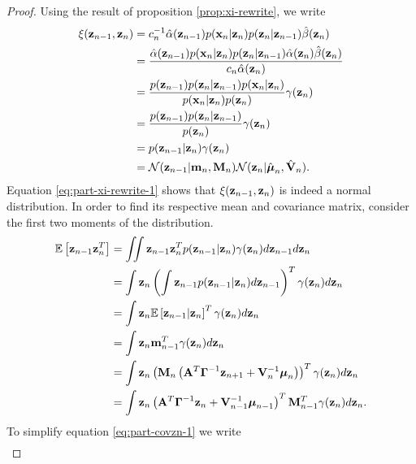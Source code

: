 \documentclass[11pt]{article}
\numberwithin{equation}{section}
\newcommand{\expectation}[1]{\mathbb{E}\left[#1\right]}
\newcommand{\x}{{\bf x}}
\newcommand{\z}{{\bf z}}
\newcommand{\N}{\mathcal{N}}
\begin{document}
\begin{proof}
	Using the result of proposition \ref{prop:xi-rewrite}, we write
	\begin{align}
		\xi(\z_{n-1}, \z_n) 
		&= c_n^{-1} \hat\alpha(\z_{n-1}) p(\x_n \vert \z_n) p(\z_n \vert \z_{n-1}) \hat\beta(\z_n) \\
		&= \frac{\hat\alpha(\z_{n-1}) p(\x_n \vert \z_n) p(\z_n \vert \z_{n-1}) \hat\alpha(\z_n)\hat\beta(\z_n)}{c_n \hat\alpha(\z_n)}\\
		&= \frac{p(\z_{n-1}) p(\z_n \vert \z_{n-1}) p(\x_n \vert \z_n)}{p(\x_n \vert \z_n) p(\z_n)} \label{eq:part-xi-rewrite-1}  \gamma(\z_n)\\
		&= \frac{p(\z_{n-1}) p(\z_n \vert \z_{n-1})}{p(\z_n)}  \gamma(\z_n)\\
		&= p(\z_{n-1} \vert \z_n) \gamma(\z_n) \\
		&= \N(\z_{n-1} \vert {\bf m}_n, {\bf M}_n) \N(\z_n \vert \hat{\boldsymbol\mu}_n, \hat{\bf V}_n) \label{eq:part-xi-rewrite}.
	\end{align}
	Equation \eqref{eq:part-xi-rewrite-1} shows that $\xi(\z_{n-1}, \z_n)$ is indeed a normal distribution. In order to find its respective mean and covariance matrix, consider the first two moments of the distribution.
	\begin{align}
		\expectation{\z_{n-1}\z_n^T} 
		&= \iint \z_{n-1}\z_{n}^T p(\z_{n-1} \vert \z_n) \gamma(\z_n) d\z_{n-1}d\z_n\\
		&= \int \z_n \left(\int \z_{n-1} p(\z_{n-1} \vert \z_n)  d\z_{n-1} \right)^T \gamma(\z_{n}) d\z_n\\
		&= \int \z_n \expectation{\z_{n-1} \vert \z_n}^T \gamma(\z_n) d\z_n\\
		&= \int \z_n {\bf m}_{n-1}^T \gamma(\z_n) d\z_n \\
		&= \int \z_n \left({\bf M}_n \left({\bf A}^T\boldsymbol\Gamma^{-1}\z_{n+1} + {\bf V}_n^{-1}\boldsymbol\mu_n\right)\right)^T \gamma(\z_n) d\z_n\\
		&= \int \z_n \left({\bf A}^T\boldsymbol\Gamma^{-1}\z_{n} + {\bf V}_{n-1}^{-1}\boldsymbol\mu_{n-1}\right)^T {\bf M}_{n-1}^T \gamma(\z_n) d\z_n \label{eq:part-covzn-1}.
	\end{align}
	To simplify equation \eqref{eq:part-covzn-1} we write
	\begin{align}

\end{align}
\end{proof}
\end{document}

